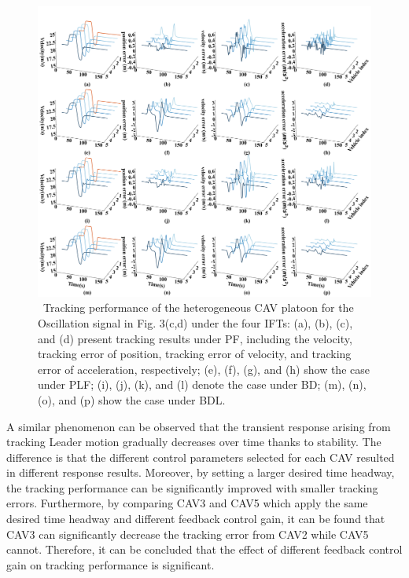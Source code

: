 \documentclass[a4paper]{cas-sc}
\begin{document}
\begin{figure}

  \centering
  \includegraphics[width=14cm]{figs/fig10.png}
  \caption{~Tracking performance of the heterogeneous CAV platoon for the Oscillation signal in Fig. 3(c,d) under the four IFTs: (a), (b), (c), and (d) present tracking results under PF, including the velocity, tracking error of position, tracking error of velocity, and tracking error of acceleration, respectively; (e), (f), (g), and (h) show the case under PLF; (i), (j), (k), and (l) denote the case under BD; (m), (n), (o), and (p) show the case under BDL.}
  \label{fig10}
\end{figure}

A similar phenomenon can be observed that the transient response arising from tracking Leader motion gradually decreases over time thanks to stability. The difference is that the different control parameters selected for each CAV resulted in different response results. Moreover, by setting a larger desired time headway, the tracking performance can be significantly improved with smaller tracking errors. Furthermore, by comparing CAV3 and CAV5 which apply the same desired time headway and different feedback control gain, it can be found that CAV3 can significantly decrease the tracking error from CAV2 while CAV5 cannot. Therefore, it can be concluded that the effect of different feedback control gain on tracking performance is significant.
\end{document}
